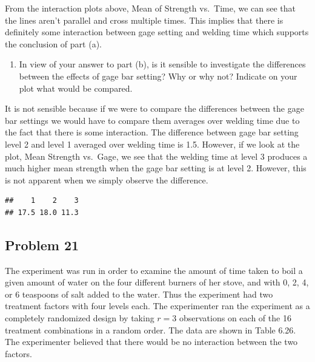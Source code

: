 \documentclass[12pt,]{article}
\newenvironment{Shaded}{\begin{snugshade}}{\end{snugshade}}
\newcommand{\KeywordTok}[1]{\textcolor[rgb]{0.13,0.29,0.53}{\textbf{#1}}}
\newcommand{\StringTok}[1]{\textcolor[rgb]{0.31,0.60,0.02}{#1}}
\newcommand{\OperatorTok}[1]{\textcolor[rgb]{0.81,0.36,0.00}{\textbf{#1}}}
\newcommand{\NormalTok}[1]{#1}
\providecommand{\tightlist}{%
  \setlength{\itemsep}{0pt}\setlength{\parskip}{0pt}}
\begin{document}
From the interaction plots above, Mean of Strength vs.~Time, we can see
that the lines aren't parallel and cross multiple times. This implies
that there is definitely some interaction between gage setting and
welding time which supports the conclusion of part (a).

\begin{enumerate}
\def\labelenumi{(\alph{enumi})}
\setcounter{enumi}{2}
\tightlist
\item
  In view of your answer to part (b), is it sensible to investigate the
  differences between the effects of gage bar setting? Why or why not?
  Indicate on your plot what would be compared.
\end{enumerate}

It is not sensible because if we were to compare the differences between
the gage bar settings we would have to compare them averages over
welding time due to the fact that there is some interaction. The
difference between gage bar setting level 2 and level 1 averaged over
welding time is 1.5. However, if we look at the plot, Mean Strength
vs.~Gage, we see that the welding time at level 3 produces a much higher
mean strength when the gage bar setting is at level 2. However, this is
not apparent when we simply observe the difference.

\begin{Shaded}
\end{Shaded}

\begin{verbatim}
##    1    2    3 
## 17.5 18.0 11.3
\end{verbatim}

\subsection{Problem 21}\label{problem-21}

The experiment was run in order to examine the amount of time taken to
boil a given amount of water on the four different burners of her stove,
and with 0, 2, 4, or 6 teaspoons of salt added to the water. Thus the
experiment had two treatment factors with four levels each. The
experimenter ran the experiment as a completely randomized design by
taking \(r = 3\) observations on each of the 16 treatment combinations
in a random order. The data are shown in Table 6.26. The experimenter
believed that there would be no interaction between the two factors.
\end{document}
